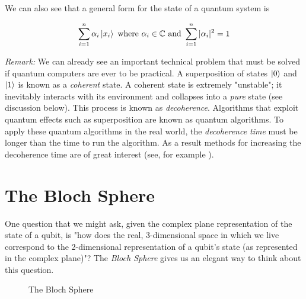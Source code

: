 \documentclass{article}
\theoremstyle{definition}
\begin{document}
 \bigskip
 \noindent
 We can also see that a general form for the state of a quantum
 system is 
 
 \begin{equation*}
 \sum\limits_{i = 1}^n \alpha_i \ket{x_i} \text{ where } \alpha_i
 \in \mathbb{C} \text{ and } \sum\limits_{i = 1}^n |\alpha_i|^2 =
 1 
 \end{equation*}

\bigskip
\noindent
\emph{Remark:} We can already see an important technical problem
that must be solved if quantum computers are ever to be
practical. A superposition of states $\ket{0}$ and $\ket{1}$ is
known as a \emph{coherent} state. A coherent state is extremely
"unstable"; it inevitably interacts with its environment and
collapses into a \emph{pure} state (see discussion below). This
process is known as \emph{decoherence}. Algorithms that exploit
quantum effects such as superposition are known as quantum
algorithms. To apply these quantum algorithms in the real world,
the \emph{decoherence time} must be longer than the time to run
the algorithm. As a result methods for increasing the decoherence
time are of great interest (see, for example
\cite{2018PNAS..11510938L}).

\section{The Bloch Sphere}
One question that we might ask, given the complex plane
representation of the state of a qubit, is "how does the real,
3-dimensional space in which we live correspond to the
2-dimensional representation of a qubit's state (as represented
in the complex plane)"? The \emph{Bloch Sphere} gives us an
elegant way to think about this question.

\bigskip
\begin{figure}[h]
\caption{The Bloch Sphere \cite{wiki:bloch_sphere}}
\label{fig:bloch_sphere}
\end{figure}
\end{document}

